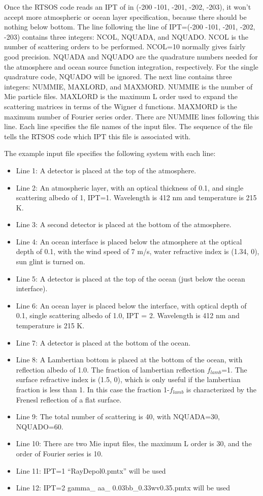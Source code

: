 \documentclass[10pt,letterpaper]{article}
\begin{document}
Once the RTSOS code reads an IPT of in (-200 -101, -201, -202, -203), it won't accept more atmospheric or ocean layer specification, because there should be nothing below bottom.  The line following the line of IPT=(-200 -101, -201, -202, -203) contains three integers: NCOL, NQUADA, and NQUADO.  NCOL is the number of scattering orders to be performed.  NCOL=10 normally gives fairly good precision. NQUADA and NQUADO are the quadrature numbers needed for the atmosphere and ocean source function integration, respectively.  For the single quadrature code, NQUADO will be ignored.  The next line contains three integers: NUMMIE, MAXLORD, and MAXMORD.  NUMMIE is the number of Mie particle files.  MAXLORD is the maximum L order used to expand the scattering matrices in terms of the Wigner d functions.  MAXMORD is the maximum number of Fourier series order.  There are NUMMIE lines following this line.  Each line specifies the file names of the input files.  The sequence of the file tells the RTSOS code which IPT this file is associated with.

The example input file specifies the following system with each line:
\begin{itemize}{}
\item Line 1: A detector is placed at the top of the atmosphere.
\item Line 2: An atmospheric layer, with an optical thickness of 0.1, and single scattering albedo of 1, IPT=1. Wavelength is 412 nm and temperature is 215 K.
\item Line 3: A second detector is placed at the bottom of the atmosphere. 
\item Line 4:  An ocean interface is placed below the atmosphere at the optical depth of 0.1, with the wind speed of 7 m/s, water refractive index is (1.34, 0), sun glint is turned on.
\item Line 5: A detector is placed at the top of the ocean (just below the ocean interface).
\item Line 6: An ocean layer is placed below the interface, with optical depth of 0.1, single scattering albedo of 1.0, IPT = 2. Wavelength is 412 nm and temperature is 215 K.
\item Line 7: A detector is placed at the bottom of the ocean. 
\item Line 8: A Lambertian bottom is placed at the bottom of the ocean, with reflection albedo of 1.0. The fraction of lambertian reflection $f_{lamb}$=1. The surface refractive index is (1.5, 0), which is only useful if the lambertian fraction is less than 1. In this case the fraction 1-$f_{lamb}$ is characterized by the Frenesl reflection of a flat surface. 
\item Line 9:  The total number of scattering is 40, with NQUADA=30, NQUADO=60. 
\item Line 10: There are two Mie input files, the maximum L order is 30, and the order of Fourier series is 10.
\item Line 11:  IPT=1   ``RayDepol0.pmtx''                will be used
\item Line 12: IPT=2   gamma\_ aa\_ 0.03bb\_0.33wv0.35.pmtx    will be used
\end{itemize}
\end{document}
